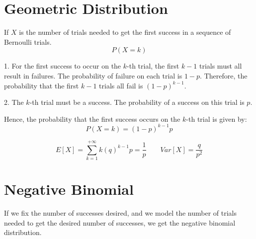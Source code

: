 \section{Geometric Distribution}
If $X$ is the number of trials needed to get the first success in a sequence of Bernoulli trials.
\[
P(X=k)
\]

1. For the first success to occur on the \( k \)-th trial, the first \( k-1 \) trials must all result in failures. The probability of failure on each trial is \( 1-p \). Therefore, the probability that the first \( k-1 \) trials all fail is \( (1-p)^{k-1} \).

2. The \( k \)-th trial must be a success. The probability of a success on this trial is \( p \).

Hence, the probability that the first success occurs on the \( k \)-th trial is given by:
\[
P(X = k) = (1-p)^{k-1}p
\]


\[
E[X] = \sum_{k=1}^{+\infty} k(q)^{k-1}p = \frac{1}{p} \qquad Var[X] = \frac{q}{p^2}
\]


\section{Negative Binomial}
If we fix the number of successes desired, and we model the number of trials needed to get the desired number of successes, we get the negative binomial distribution.


